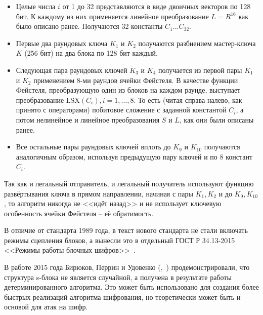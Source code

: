 \begin{itemize}
	\item Целые числа $i$ от 1 до 32 представляются в виде двоичных векторов по 128 бит. К каждому из них применяется линейное преобразование $L=R^{16}$ как было описано ранее. Получаются 32 константы $C_{1}...C_{32}$.
	\item Первые два раундовых ключа $K_1$ и $K_2$ получаются разбиением мастер-ключа $K$ (256 бит) на два блока по 128 бит каждый.
	\item Следующая пара раундовых ключей $K_3$ и $K_4$ получается из первой пары $K_1$ и $K_2$ применением 8-ми раундов ячейки Фейстеля. В качестве функции Фейстеля, преобразующую один из блоков на каждом раунде, выступает преобразование $\text{LSX}(C_i), i=1,\dots,8$. То есть (читая справа налево, как принято с операторами) побитовое сложение с заданной константой $C_i$, а потом нелинейное и линейное преобразования $S$ и $L$, как они были описаны ранее.
	\item Все остальные пары раундовых ключей вплоть до $K_{9}$ и $K_{10}$ получаются аналогичным образом, используя предыдущую пару ключей и по 8 констант $C_i$.
\end{itemize}

Так как и легальный отправитель, и легальный получатель используют функцию развёртывания ключа в прямом направлении, начиная с пары $K_1, K_2$ и до $K_{9}, K_{10}$, то алгоритм никогда не <<идёт назад>> и не использует ключевую особенность ячейки Фейстеля -- её обратимость.

В отличие от стандарта 1989 года, в текст нового стандарта не стали включать режимы сцепления блоков, а вынесли это в отдельный ГОСТ Р 34.13-2015 <<Режимы работы блочных шифров>>~\cite{GOST-R:34.13-2015}.

В работе 2015 года Бирюков, Перрин и Удовенко (,~\cite{Biryukov:Perrin:Udovenko:2015}) продемонстрировали, что структура s-блока не является случайной, а получена в результате работы детерминированного алгоритма. Это может быть использовано для создания более быстрых реализаций алгоритма шифрования, но теоретически может быть и основой для атак на шифр.

